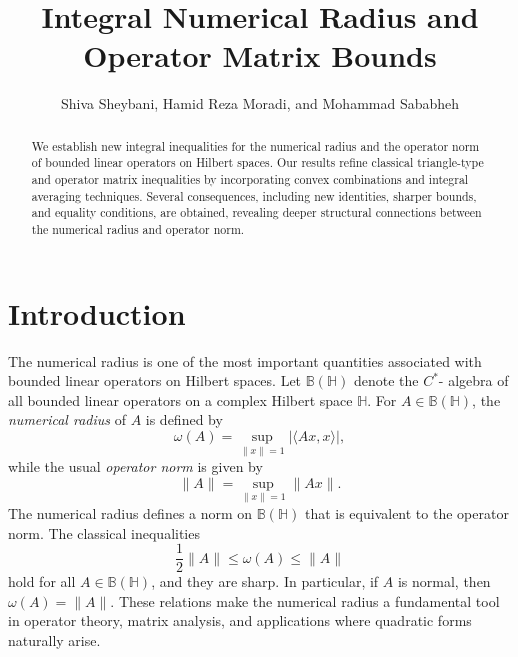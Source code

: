 \documentclass[12pt,twoside,reqno]{amsart}
\numberwithin{equation}{section}
\begin{document}
\title{Integral Numerical Radius  and Operator Matrix Bounds}
\author{Shiva Sheybani, Hamid Reza Moradi, and Mohammad Sababheh}




\begin{abstract}
We establish new integral inequalities for the numerical radius and the operator norm of bounded linear operators on Hilbert spaces. Our results refine classical triangle-type and operator matrix inequalities by incorporating convex combinations and integral averaging techniques. Several consequences, including new identities, sharper bounds, and equality conditions, are obtained, revealing deeper structural connections between the numerical radius and operator norm.
 
\end{abstract}
\maketitle
\pagestyle{myheadings}
%
\markboth{\centerline{}}
{\centerline{}}
\bigskip
\bigskip
\section{Introduction}

The numerical radius is one of the most important quantities associated with bounded linear operators on Hilbert spaces. Let $\mathbb{B}(\mathbb{H})$ denote the $C^*$- algebra of all bounded linear operators on a complex Hilbert space $\mathbb{H}$. For $A\in\mathbb{B}(\mathbb{H})$, the \emph{numerical radius} of $A$ is defined by
\[
\omega(A)=\sup_{\|x\|=1}|\langle Ax,x\rangle|,
\]
while the usual \emph{operator norm} is given by
\[
\|A\|=\sup_{\|x\|=1}\|Ax\|.
\]
The numerical radius defines a norm on $\mathbb{B}(\mathbb{H})$ that is equivalent to the operator norm. The classical inequalities \cite[Theorem 1.3-1]{Gustafson_Book_1997}
\[
\frac{1}{2}\|A\|\le \omega(A)\le \|A\|
\]
hold for all $A\in\mathbb{B}(\mathbb{H})$, and they are sharp. In particular, if $A$ is normal, then $\omega(A)=\|A\|$. These relations make the numerical radius a fundamental tool in operator theory, matrix analysis, and applications where quadratic forms naturally arise.
\end{document}
